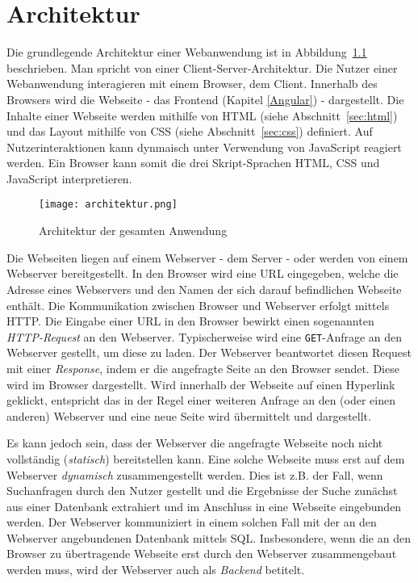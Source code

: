 \chapter{Architektur}

Die grundlegende Architektur einer Webanwendung ist in Abbildung~\ref{img:architektur} beschrieben. Man spricht von einer Client-Server-Architektur. Die Nutzer einer Webanwendung interagieren mit einem Browser, dem Client. Innerhalb des Browsers wird die Webseite - das Frontend (Kapitel \ref{Angular}) - dargestellt. Die Inhalte einer Webseite werden mithilfe von \ac{HTML} (siehe Abschnitt~\ref{sec:html}) und das Layout mithilfe von \ac{CSS} (siehe Abschnitt~\ref{sec:css}) definiert. Auf Nutzerinteraktionen kann dynmaisch unter Verwendung von JavaScript reagiert werden. Ein Browser kann somit die drei Skript-Sprachen HTML, CSS und JavaScript interpretieren.

\begin{figure}[htbp]
    \centering
    \texttt{[image: architektur.png]}
    \caption{Architektur der gesamten Anwendung}
    \label{img:architektur}
\end{figure}

Die Webseiten liegen auf einem Webserver - dem Server - oder werden von einem Webserver bereitgestellt. In den Browser wird eine \ac{URL} eingegeben, welche die Adresse eines Webservers und den Namen der sich darauf befindlichen Webseite enthält. Die Kommunikation zwischen Browser und Webserver erfolgt mittels \ac{HTTP}. Die Eingabe einer URL in den Browser bewirkt einen sogenannten \textit{HTTP-Request} an den Webserver. Typischerweise wird eine \texttt{GET}-Anfrage an den Webserver gestellt, um diese zu laden. Der Webserver beantwortet diesen Request mit einer \textit{Response}, indem er die angefragte Seite an den Browser sendet. Diese wird im Browser dargestellt. Wird innerhalb der Webseite auf einen Hyperlink geklickt, entspricht das in der Regel einer weiteren Anfrage an den (oder einen anderen) Webserver und eine neue Seite wird übermittelt und dargestellt.

Es kann jedoch sein, dass der Webserver die angefragte Webseite noch nicht vollständig (\textit{statisch}) bereitstellen kann. Eine solche Webseite muss erst auf dem Webserver \textit{dynamisch} zusammengestellt werden. Dies ist z.B. der Fall, wenn Suchanfragen durch den Nutzer gestellt und die Ergebnisse der Suche zunächst aus einer Datenbank extrahiert und im Anschluss in eine Webseite eingebunden werden. Der Webserver kommuniziert in einem solchen Fall mit der an den Webserver angebundenen Datenbank mittels \ac{SQL}. Insbesondere, wenn die an den Browser zu übertragende Webseite erst durch den Webserver \glqq zusammengebaut\grqq{} werden muss, wird der Webserver auch als \textit{Backend} betitelt.

